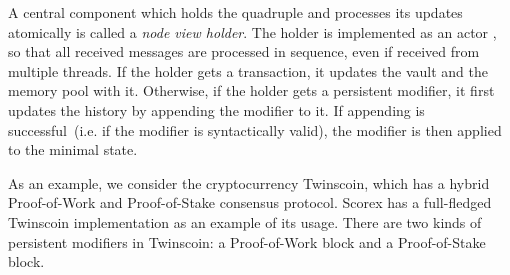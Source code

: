 A central component which holds the quadruple {\em <history, minimal state, vault, memory pool>} and processes its updates atomically is called a {\em node view holder}. The holder is implemented as an actor , so that all received messages are processed in sequence, even if received from multiple threads. If the holder gets a transaction, it updates the vault and the memory pool with it. Otherwise, if the holder gets a persistent modifier, it first updates the history by appending the modifier to it. If appending is successful~(i.e. if the modifier is syntactically valid), the modifier is then applied to the minimal state.  

As an example, we consider the cryptocurrency Twinscoin, which has a hybrid Proof-of-Work and Proof-of-Stake consensus protocol. Scorex has a full-fledged Twinscoin implementation as an example of its usage. There are two kinds of persistent modifiers in Twinscoin: a Proof-of-Work block and a Proof-of-Stake block. 
